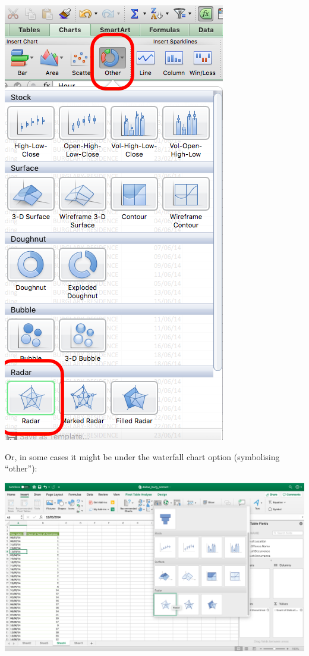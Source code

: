\documentclass[
]{book}
\begin{document}
\includegraphics{imgs/hr_radar_1.png}

Or, in some cases it might be under the waterfall chart option (symbolising ``other''):

\includegraphics{imgs/waterfall_radial.png}
\end{document}
